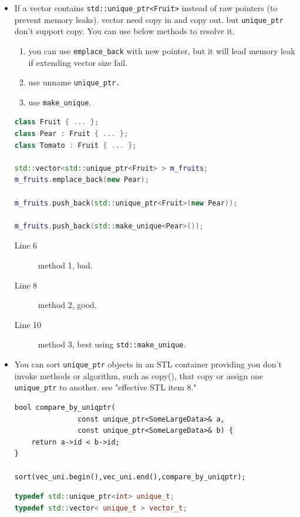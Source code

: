 \documentclass[a4paper,11pt,twoside]{book}
\begin{document}
\begin{itemize}
\item If a vector contains \texttt{std::unique\_ptr<Fruit>} instead of raw pointers (to prevent memory leaks). vector need copy in and copy out. but \texttt{unique\_ptr} don't support copy. You can use below methods to resolve it.
\begin{enumerate}
	\item you can use \texttt{emplace\_back} with new pointer, but it will lead memory leak if extending vector size fail.
	\item use unname \texttt{unique\_ptr.}
	\item use \texttt{make\_unique}.
\end{enumerate}
\begin{lstlisting}[frame=single, language=c++]
class Fruit { ... };
class Pear : Fruit { ... };
class Tomato : Fruit { ... };

std::vector<std::unique_ptr<Fruit> > m_fruits;
m_fruits.emplace_back(new Pear);

m_fruits.push_back(std::unique_ptr<Fruit>(new Pear));

m_fruits.push_back(std::make_unique<Pear>());
\end{lstlisting}
\begin{description}
	\item[Line 6] method 1, bad.
	\item[Line 8] method 2, good.
	\item[Line 10] method 3, best using \texttt{std::make\_unique}.
\end{description}

\item You can sort \texttt{unique\_ptr} objects in an STL container providing you don't invoke methods or algorithm, such as copy(), that copy or assign one \texttt{unique\_ptr} to another.  see "effective STL item 8."

\begin{lstlisting}[numbers=none]
bool compare_by_uniqptr(
               const unique_ptr<SomeLargeData>& a,
               const unique_ptr<SomeLargeData>& b) {
    return a->id < b->id;
}

sort(vec_uni.begin(),vec_uni.end(),compare_by_uniqptr);
\end{lstlisting}


\begin{lstlisting}[frame=single, language=c++]
typedef std::unique_ptr<int> unique_t;
typedef std::vector< unique_t > vector_t;


\end{lstlisting}
\end{itemize}
\end{document}
